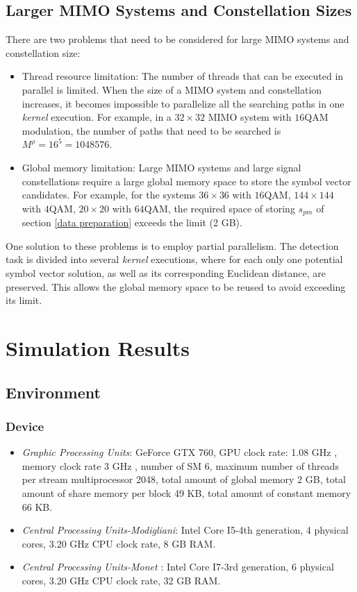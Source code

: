 \documentclass[letterpaper, 10pt, conference, twoside]{ieeeconf}
\begin{document}
\subsection{Larger MIMO Systems and Constellation Sizes}
There are two problems that need to be considered for large MIMO systems and constellation size:
\begin{itemize}
\item Thread resource limitation:
The number of threads that can be executed in parallel is limited. When the size of a MIMO system and constellation increases, it becomes impossible to parallelize all the searching paths in one \textit{kernel} execution. For example, in a $32\times 32$ MIMO system with $16$QAM modulation, the number of paths that need to be searched is $M^{\rho}=16^{5}=1048576$.  
\item Global memory limitation:
Large MIMO systems and large signal constellations require a large global memory space to store the symbol vector candidates. For example, for the systems $36\times 36$ with $16$QAM, $144\times 144$ with $4$QAM, $20\times 20$ with $64$QAM, the required space of storing $s_{pm}$ of section \ref{data preparation} exceeds the limit (2 GB).
\end{itemize}

One solution to these problems is to employ partial parallelism. The detection task is divided into several \textit{kernel} executions, where for each only one potential symbol vector solution, as well as its corresponding Euclidean distance, are preserved. This allows the global memory space to be reused to avoid exceeding its limit. 
\section{Simulation Results}\label{simulation}
\subsection{Environment}
\subsubsection{Device}
\begin{itemize}
\item \emph{Graphic Processing Units}: GeForce GTX 760, GPU clock rate: 1.08 GHz , memory clock rate 3 GHz , number of SM 6, maximum number of threads per stream multiprocessor 2048, total amount of global memory 2 GB, total amount of share memory per block 49 KB, total amount of constant memory 66 KB. 
\item \emph{Central Processing Units-Modigliani}: Intel Core I5-4th generation, 4 physical cores, 3.20 GHz CPU clock rate, 8 GB RAM.
\item \emph{Central Processing Units-Monet} : Intel Core I7-3rd generation, 6 physical cores, 3.20 GHz CPU clock rate, 32 GB RAM.
\end{itemize}
\end{document}
